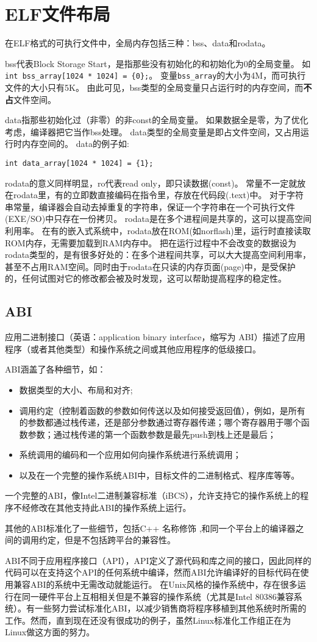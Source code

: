  

\section{ELF文件布局}
在ELF格式的可执行文件中，全局内存包括三种：bss、data和rodata。

bss代表Block Storage Start，是指那些没有初始化的和初始化为0的全局变量。
如\verb$int bss_array[1024 * 1024] = {0};$。
变量\verb$bss_array$的大小为4M，而可执行文件的大小只有5K。 
由此可见，bss类型的全局变量只占运行时的内存空间，而\textbf{不占}文件空间。

data指那些初始化过（非零）的非const的全局变量。
如果数据全是零，为了优化考虑，编译器把它当作bss处理。
data类型的全局变量是即占文件空间，又占用运行时内存空间的。
data的例子如:

\verb$int data_array[1024 * 1024] = {1};$


rodata的意义同样明显，ro代表read only，即只读数据(const)。
常量不一定就放在rodata里，有的立即数直接编码在指令里，存放在代码段(.text)中。
对于字符串常量，编译器会自动去掉重复的字符串，保证一个字符串在一个可执行文件(EXE/SO)中只存在一份拷贝。
rodata是在多个进程间是共享的，这可以提高空间利用率。
在有的嵌入式系统中，rodata放在ROM(如norflash)里，运行时直接读取ROM内存，无需要加载到RAM内存中。
把在运行过程中不会改变的数据设为rodata类型的，是有很多好处的：在多个进程间共享，可以大大提高空间利用率，甚至不占用RAM空间。同时由于rodata在只读的内存页面(page)中，是受保护的，任何试图对它的修改都会被及时发现，这可以帮助提高程序的稳定性。

\subsection{ABI}
应用二进制接口（英语：application binary interface，缩写为 ABI）描述了应用程序（或者其他类型）和操作系统之间或其他应用程序的低级接口。

ABI涵盖了各种细节，如：
\begin{itemize}
\item 数据类型的大小、布局和对齐;
\item 调用约定（控制着函数的参数如何传送以及如何接受返回值），例如，是所有的参数都通过栈传递，还是部分参数通过寄存器传递；哪个寄存器用于哪个函数参数；通过栈传递的第一个函数参数是最先push到栈上还是最后；
\item 系统调用的编码和一个应用如何向操作系统进行系统调用；
\item 以及在一个完整的操作系统ABI中，目标文件的二进制格式、程序库等等。
\end{itemize}
一个完整的ABI，像Intel二进制兼容标准（iBCS），允许支持它的操作系统上的程序不经修改在其他支持此ABI的操作系统上运行。

其他的ABI标准化了一些细节，包括C++ 名称修饰 ,和同一个平台上的编译器之间的调用约定，但是不包括跨平台的兼容性。

ABI不同于应用程序接口（API），API定义了源代码和库之间的接口，因此同样的代码可以在支持这个API的任何系统中编译，然而ABI允许编译好的目标代码在使用兼容ABI的系统中无需改动就能运行。 在Unix风格的操作系统中，存在很多运行在同一硬件平台上互相相关但是不兼容的操作系统（尤其是Intel 80386兼容系统）。有一些努力尝试标准化ABI，以减少销售商将程序移植到其他系统时所需的工作。然而，直到现在还没有很成功的例子，虽然Linux标准化工作组正在为Linux做这方面的努力。
